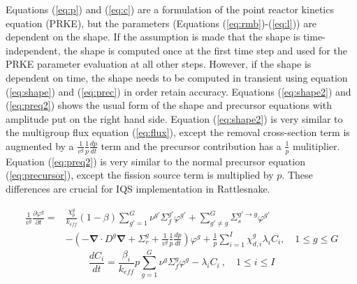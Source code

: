 \documentclass[10pt]{scrartcl}
\renewcommand{\div}{\bs{\nabla}\! \cdot \!}
\newcommand{\grad}{\bs{\nabla}}
\newcommand{\bs}[1]{\mathbf{#1}}
\newcommand{\keff}{k_\textit{eff}}
\newcommand{\be}{\begin{equation}}
\newcommand{\ee}{\end{equation}}
\begin{document}
Equations (\ref{eq:p}) and (\ref{eq:c}) are a formulation of the point reactor kinetics equation (PRKE), but the parameters (Equations (\ref{eq:rmb})-(\ref{eq:l})) are dependent on the shape.  If the assumption is made that the shape is time-independent, the shape is computed once at the first time step and used for the PRKE parameter evaluation at all other steps.  However, if the shape is dependent on time, the shape needs to be computed in transient using equation (\ref{eq:shape}) and (\ref{eq:prec}) in order retain accuracy.  Equations (\ref{eq:shape2}) and (\ref{eq:preq2}) shows the usual form of the shape and precursor equations with amplitude put on the right hand side.  Equation (\ref{eq:shape2}) is very similar to the multigroup flux equation (\ref{eq:flux}), except the removal cross-section term is augmented by a $\frac{1}{v^g}\frac{1}{p}\frac{dp}{dt}$ term and the precursor contribution has a $\frac{1}{p}$ mulitiplier.  Equation (\ref{eq:preq2}) is very similar to the normal precursor equation (\ref{eq:precursor}), except the fission source term is multiplied by $p$.  These differences are crucial for IQS implementation in Rattlesnake.

\begin{align}
\frac{1}{v^g}\frac{\partial\varphi^g}{\partial t} = &\frac{\chi_p^g}{\keff} (1-\beta)\sum_{g'=1}^G  \nu^{g'} \Sigma_f^{g'} \varphi^{g'} + \sum_{g'\neq g}^G\Sigma_s^{g'\to g} \varphi^{g'} \nonumber \\ 
& -  \left( -\div D^g \grad  + \Sigma_r^g + \frac{1}{v^g}\frac{1}{p}\frac{dp}{dt}\right) \varphi^g + \frac{1}{p}\sum_{i=1}^I\chi_{d,i}^g\lambda_iC_i  , \quad 1 \le g \le G 
\label{eq:shape2}
\end{align}
\be
\frac{dC_i}{dt} = \frac{\beta_i}{k_{eff}}p \sum_{g=1}^G\nu^{g} \Sigma_f^g \varphi^{g} - \lambda_i C_i \ , \quad 1 \le i \le I 
\label{eq:preq2}
\ee

\end{document}
